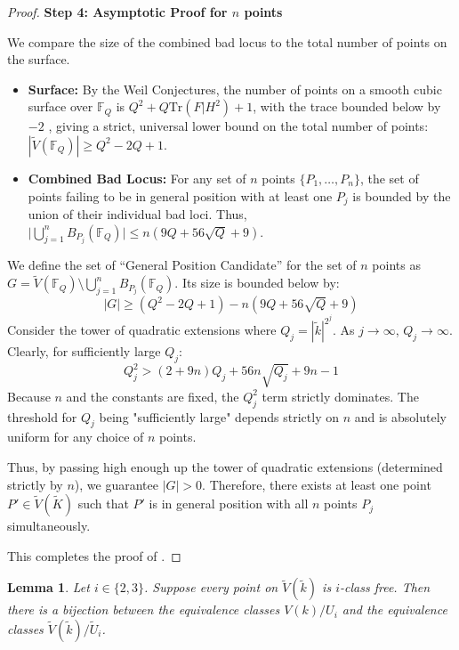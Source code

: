 \documentclass[11pt]{article}
\newtheorem{lemma}[theorem]{Lemma}
\theoremstyle{definition}
\begin{document}
\begin{proof}
\vspace{0.5em}
\noindent\textbf{Step 4: Asymptotic Proof for $n$ points}

We compare the size of the combined bad locus to the total number of points on the surface.
\begin{itemize}
    \item \textbf{Surface:} By the Weil Conjectures, the number of points on a smooth cubic surface over $\mathbb{F}_Q$ is $Q^2 + Q\text{Tr}(F | H^2) + 1$, with the trace bounded below by $-2$ \cite[Table 1]{manin3}, giving a strict, universal lower bound on the total number of points: $|\tilde{V}(\mathbb{F}_Q)| \ge Q^2 - 2Q + 1$.
    \item \textbf{Combined Bad Locus:} For any set of $n$ points $\{P_1, \dots, P_n\}$, the set of points failing to be in general position with at least one $P_j$ is bounded by the union of their individual bad loci. Thus, $\big| \bigcup_{j=1}^n B_{P_j}(\mathbb{F}_Q) \big| \le n(9Q + 56\sqrt{Q} + 9)$.
\end{itemize}

We define the set of ``General Position Candidate'' for the set of $n$ points as $G = \tilde{V}(\mathbb{F}_Q) \setminus \bigcup_{j=1}^n B_{P_j}(\mathbb{F}_Q)$. Its size is bounded below by:
\[
|G| \ge (Q^2 - 2Q + 1) - n(9Q + 56\sqrt{Q} + 9)
\]
Consider the tower of quadratic extensions where $Q_j = |\tilde{k}|^{2^j}$. As $j \to \infty$, $Q_j \to \infty$. Clearly, for sufficiently large $Q_j$:
\[
Q_j^2 > (2 + 9n)Q_j + 56n\sqrt{Q_j} + 9n - 1
\]
Because $n$ and the constants are fixed, the $Q_j^2$ term strictly dominates. The threshold for $Q_j$ being "sufficiently large" depends strictly on $n$ and is absolutely uniform for any choice of $n$ points.

Thus, by passing high enough up the tower of quadratic extensions (determined strictly by $n$), we guarantee $|G| > 0$. Therefore, there exists at least one point $P' \in \tilde{V}(\tilde{K})$ such that $P'$ is in general position with all $n$ points $P_j$ simultaneously.

This completes the proof of .
\end{proof}

\begin{lemma}
\label{thm:biject}
Let $i \in \{2, 3\}$. Suppose every point on $\tilde{V}(\tilde{k})$ is $i$-class free. Then there is a bijection between the equivalence classes $V(k)/U_i$ and the equivalence classes $\tilde{V}(\tilde{k})/\tilde{U}_i$.
\end{lemma}
\end{document}
